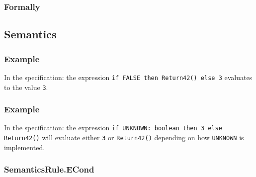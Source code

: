 \subsubsection{Formally}
\begin{mathpar}
\end{mathpar}

\subsection{Semantics}
\subsubsection{Example}
In the specification:
the expression \texttt{if FALSE then Return42() else 3} evaluates to the value \texttt{3}.

\subsubsection{Example}
In the specification:
the expression \texttt{if UNKNOWN: boolean then 3 else Return42()} will
evaluate either \texttt{3} or \texttt{Return42()} depending on how
\texttt{UNKNOWN} is implemented.

\subsubsection{SemanticsRule.ECond \label{sec:SemanticsRule.ECond}}
